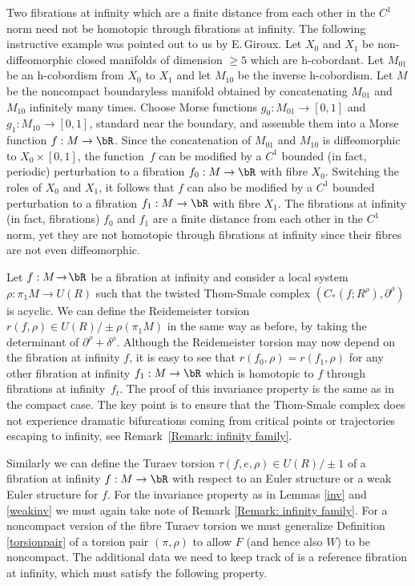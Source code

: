 \begin{warning}
Two fibrations at infinity which are a finite distance from each other in the $C^1$ norm need not be homotopic through fibrations at infinity. The following instructive example was pointed out to us by E.\,Giroux. Let $X_0$ and $X_1$ be non-diffeomorphic closed manifolds of dimension $\geq 5$ which are h-cobordant. Let $M_{01}$ be an h-cobordism from $X_0$ to $X_1$ and let $M_{10}$ be the inverse h-cobordism. Let $M$ be the noncompact boundaryless manifold obtained by concatenating $M_{01}$ and $M_{10}$ infinitely many times. Choose Morse functions $g_0:M_{01} \to [0,1]$ and $g_1:M_{10} \to [0,1]$, standard near the boundary, and assemble them into a Morse function $f:M \to \bR$. Since the concatenation of $M_{01}$ and $M_{10}$ is diffeomorphic to $X_0 \times [0,1]$, the function~$f$ can be modified by a $C^1$ bounded (in fact, periodic) perturbation to a fibration $f_0 : M \to \bR$ with fibre $X_0$. Switching the roles of $X_0$ and $X_1$, it follows that $f$ can also be modified by a $C^1$ bounded perturbation to a fibration $f_1: M \to \bR$ with fibre $X_1$. The fibrations at infinity (in fact, fibrations) $f_0$ and $f_1$ are a finite distance from each other in the $C^1$ norm, yet they are not homotopic through fibrations at infinity since their fibres are not even diffeomorphic.
\end{warning}

Let $f:M\!\to\!\bR$ be a fibration at infinity and consider a local system \hbox{$\rho: \pi_1 M\!\to\!U(R)$} such that the twisted Thom-Smale complex $(C_*(f; R^\rho), \partial^\rho)$ is acyclic. We can define the Reidemeister torsion $r(f,\rho) \in U(R) / \pm \rho(\pi_1M)$ in the same way as before, by taking the determinant of $\partial^\rho + \delta^\rho$. Although the Reidemeister torsion may now depend on the fibration at infinity $f$, it is easy to see that $r(f_0,\rho)=r(f_1,\rho)$ for any other fibration at infinity $f_1: M \to \bR$ which is homotopic to $f$ through fibrations at infinity~$f_t$. The proof of this invariance property is the same as in the compact case. The key point is to ensure that the Thom-Smale complex does not experience dramatic bifurcations coming from critical points or trajectories escaping to infinity, see Remark~\ref{Remark: infinity family}.

Similarly we can define the Turaev torsion $\tau(f,e,\rho) \in U(R) / \pm 1$ of a fibration at infinity $f:M \to \bR$ with respect to an Euler structure or a weak Euler structure for $f$. For the invariance property as in Lemmas \ref{inv} and \ref{weakinv} we must again take note of Remark \ref{Remark: infinity family}. For a noncompact version of the fibre Turaev torsion we must generalize Definition \ref{torsionpair} of a torsion pair $(\pi,\rho)$ to allow $F$ (and hence also $W$) to be noncompact. The additional data we need to keep track of is a reference fibration at infinity, which must satisfy the following property.

